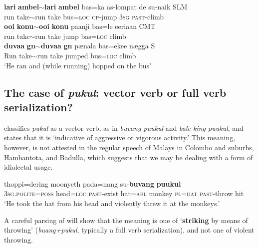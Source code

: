\ea
\ea\label{jaffar:ex:67}
\gll \textbf{lari} \textbf{ambel${\sim}$lari} \textbf{ambel} bas=ka as-lompat de su-naik SLM \\
 run take${\sim}$run take bus=\textsc{loc}  \textsc{cp}-jump 3\textsc{sg} \textsc{past}-climb\\
\ex \label{jaffar:ex:68}
\gll \textbf{oo{\dz}i} \textbf{kon{\dz}u${\sim}$oo{\dz}i} \textbf{kon{\dz}u} paanji bas=le eeri{\textrtailt}aan  CMT \\
 run take${\sim}$run take jump bas=\textsc{loc}  climb\\
\ex%
\gll \textbf{duvaa} \textbf{g{\E}n{\E}${\sim}$duvaa} \textbf{g{\E}n{\E}} p{\ae}nala bas=ekee n{\ae}gga  S \\
 Run take${\sim}$run take jumped bus=\textsc{loc}  climb\\ 
 `He ran and (while running) hopped on the bus'
\z
\z

\subsection{The case of \textit{pukul}: vector verb or full verb serialization?}\label{jaffar:sec:5}

\citet[186]{Nordhoff2009} classifies \textit{pukul} as a vector verb, as in  \textit{buvang-puukul} and  \textit{bale-king puukul}, and states that it is `indicative of aggressive or vigorous activity.' This meaning, however, is not attested in the regular speech of Malays in Colombo and suburbs, Hambantota, and Badulla, which suggests that we may be dealing with a form of idiolectal usage.

\ea\label{jaffar:ex:70}
\gll 
[Incayang=pe\footnotemark{} kàpaala=ka anà-aada] thoppi=dering moonyeth pada=nang su-\textbf{buvang} \textbf{puukul}\\
3\textsc{sg}.\textsc{polite}=\textsc{poss} head=\textsc{loc}  \textsc{past}-exist hat=\textsc{abl}  monkey \textsc{pl}=\textsc{dat}  \textsc{past}-throw hit\\
`He took the hat from his head and violently threw it at the monkeys.'
\z

A careful parsing of  will show that the meaning is one of `\textbf{striking} by means of throwing' (\textit{buang+pukul}, typically a full verb serialization), and not one of violent throwing.


